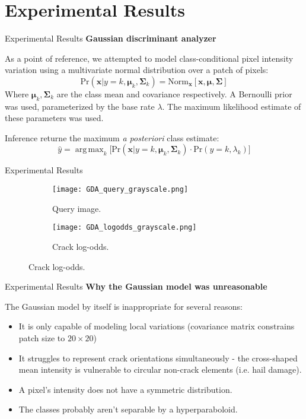 \documentclass[10pt]{beamer}
\DeclareMathOperator*{\argmax}{arg\,max}
\begin{document}
\section{Experimental Results}

\begin{frame}{Experimental Results}
	\textbf{Gaussian discriminant analyzer}
	
	As a point of reference, we attempted to model class-conditional pixel intensity variation using a multivariate normal distribution over a patch of pixels:
	\[
		\text{Pr}(\mathbf{x}|y = k, \boldsymbol{\mu}_k, \mathbf{\Sigma}_k) = \text{Norm}_{\mathbf{x}}[\mathbf{x}, \boldsymbol{\mu}, \mathbf{\Sigma}]
	\]
	Where $\boldsymbol{\mu}_k, \mathbf{\Sigma}_k$ are the class mean and covariance respectively. A Bernoulli prior was used, parameterized by the base rate $\lambda$. The maximum likelihood estimate of these parameters was used.
	
	 Inference returne the maximum \emph{a posteriori} class estimate:
	\[
		\hat{y} = \argmax_k \Big[\text{Pr}(\mathbf{x}|y = k, \boldsymbol{\mu}_k, \mathbf{\Sigma}_k) \cdot \text{Pr}(y = k, \lambda_k) \Big]
	\]
\end{frame}

\begin{frame}{Experimental Results}
	\begin{figure}
		\begin{subfigure}[b]{0.25\textwidth}
			\texttt{[image: GDA\_query\_grayscale.png]}
			\caption{Query image.}
		\end{subfigure}
		\qquad\qquad
		\begin{subfigure}[b]{0.25\textwidth}
			\texttt{[image: GDA\_logodds\_grayscale.png]}
			\caption{Crack log-odds.}
		\end{subfigure}
	
	\end{figure}
\end{frame}

\begin{frame}{Experimental Results}
	\textbf{Why the Gaussian model was unreasonable}
	
	The Gaussian model by itself is inappropriate for several reasons:
	\begin{itemize}
		\item It is only capable of modeling local variations (covariance matrix constrains patch size to $20 \times 20$)
		\item It struggles to represent crack orientations simultaneously - the cross-shaped mean intensity is vulnerable to circular non-crack elements (i.e. hail damage).
		\item A pixel's intensity does not have a symmetric distribution.
		\item The classes probably aren't separable by a hyperparaboloid.
	\end{itemize}
\end{frame}
\end{document}
